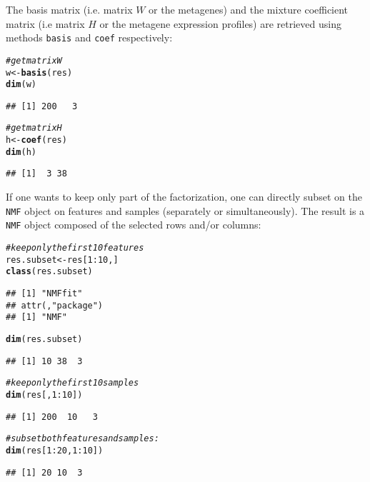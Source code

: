 \documentclass[a4paper]{article}\usepackage[]{graphicx}\usepackage[]{color}
\makeatletter
\newcommand{\hlnum}[1]{\textcolor[rgb]{0.686,0.059,0.569}{#1}}%
\newcommand{\hlcom}[1]{\textcolor[rgb]{0.678,0.584,0.686}{\textit{#1}}}%
\newcommand{\hlopt}[1]{\textcolor[rgb]{0,0,0}{#1}}%
\newcommand{\hlstd}[1]{\textcolor[rgb]{0.345,0.345,0.345}{#1}}%
\newcommand{\hlkwb}[1]{\textcolor[rgb]{0.69,0.353,0.396}{#1}}%
\newcommand{\hlkwd}[1]{\textcolor[rgb]{0.737,0.353,0.396}{\textbf{#1}}}%
\newenvironment{kframe}{%
 \def\at@end@of@kframe{}%
 \ifinner\ifhmode%
  \def\at@end@of@kframe{\end{minipage}}%
  \begin{minipage}{\columnwidth}%
 \fi\fi%
 \def\FrameCommand##1{\hskip\@totalleftmargin \hskip-\fboxsep
 \colorbox{shadecolor}{##1}\hskip-\fboxsep
     \hskip-\linewidth \hskip-\@totalleftmargin \hskip\columnwidth}%
 \MakeFramed {\advance\hsize-\width
   \@totalleftmargin\z@ \linewidth\hsize
   \@setminipage}}%
 {\par\unskip\endMakeFramed%
 \at@end@of@kframe}
\newenvironment{knitrout}{}{} %
\let\code=\texttt
\makeatother
\begin{document}
The basis matrix (i.e. matrix $W$ or the metagenes) and the mixture coefficient matrix (i.e matrix $H$ or the metagene expression profiles) are retrieved using methods \code{basis} and \code{coef} respectively:

\begin{knitrout}
\color{fgcolor}\begin{kframe}
\begin{alltt}
\hlcom{# get matrix W}
\hlstd{w} \hlkwb{<-} \hlkwd{basis}\hlstd{(res)}
\hlkwd{dim}\hlstd{(w)}
\end{alltt}
\begin{verbatim}
## [1] 200   3
\end{verbatim}
\begin{alltt}
\hlcom{# get matrix H}
\hlstd{h} \hlkwb{<-} \hlkwd{coef}\hlstd{(res)}
\hlkwd{dim}\hlstd{(h)}
\end{alltt}
\begin{verbatim}
## [1]  3 38
\end{verbatim}
\end{kframe}
\end{knitrout}


If one wants to keep only part of the factorization, one can directly subset on the \code{NMF} object on features and samples (separately or simultaneously).
The result is a \code{NMF} object composed of the selected rows and/or columns:
\begin{knitrout}
\color{fgcolor}\begin{kframe}
\begin{alltt}
\hlcom{# keep only the first 10 features}
\hlstd{res.subset} \hlkwb{<-} \hlstd{res[}\hlnum{1}\hlopt{:}\hlnum{10}\hlstd{,]}
\hlkwd{class}\hlstd{(res.subset)}
\end{alltt}
\begin{verbatim}
## [1] "NMFfit"
## attr(,"package")
## [1] "NMF"
\end{verbatim}
\begin{alltt}
\hlkwd{dim}\hlstd{(res.subset)}
\end{alltt}
\begin{verbatim}
## [1] 10 38  3
\end{verbatim}
\begin{alltt}
\hlcom{# keep only the first 10 samples }
\hlkwd{dim}\hlstd{(res[,}\hlnum{1}\hlopt{:}\hlnum{10}\hlstd{])}
\end{alltt}
\begin{verbatim}
## [1] 200  10   3
\end{verbatim}
\begin{alltt}
\hlcom{# subset both features and samples:}
\hlkwd{dim}\hlstd{(res[}\hlnum{1}\hlopt{:}\hlnum{20}\hlstd{,}\hlnum{1}\hlopt{:}\hlnum{10}\hlstd{])}
\end{alltt}
\begin{verbatim}
## [1] 20 10  3
\end{verbatim}
\end{kframe}
\end{knitrout}
\end{document}
